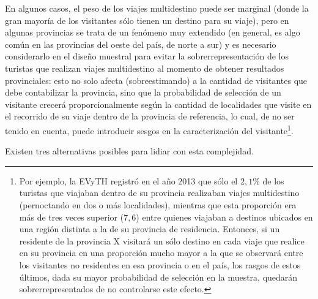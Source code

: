 \documentclass[
]{book}
\begin{document}
En algunos casos, el peso de los viajes multidestino puede ser marginal (donde la gran mayoría de los visitantes sólo tienen un destino para su viaje), pero en algunas provincias se trata de un fenómeno muy extendido (en general, es algo común en las provincias del oeste del país, de norte a sur) y es necesario considerarlo en el diseño muestral para evitar la sobrerrepresentación de los turistas que realizan viajes multidestino al momento de obtener resultados provinciales: esto no solo afecta (sobreestimando) a la cantidad de visitantes que debe contabilizar la provincia, sino que la probabilidad de selección de un visitante crecerá proporcionalmente según la cantidad de localidades que visite en el recorrido de su viaje dentro de la provincia de referencia, lo cual, de no ser tenido en cuenta, puede introducir sesgos en la caracterización del visitante\footnote{Por ejemplo, la EVyTH registró en el año 2013 que sólo el \(2,1\%\) de los turistas que viajaban dentro de su provincia realizaban viajes multidestino (pernoctando en dos o más localidades), mientras que esta proporción era más de tres veces superior (\(7,6%
  \)) entre quienes viajaban a destinos ubicados en una región distinta a la de su provincia de residencia. Entonces, si un residente de la provincia X visitará un sólo destino en cada viaje que realice en su provincia en una proporción mucho mayor a la que se observará entre los visitantes no residentes en esa provincia o en el país, los rasgos de estos últimos, dada su mayor probabilidad de selección en la muestra, quedarán sobrerrepresentados de no controlarse este efecto.}.

Existen tres alternativas posibles para lidiar con esta complejidad.
\end{document}
